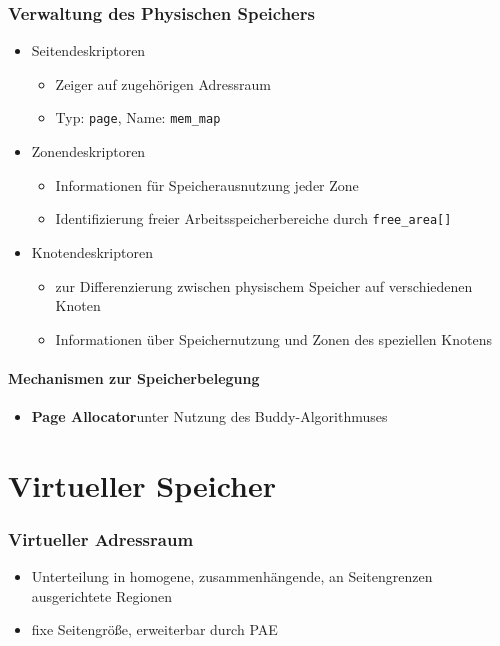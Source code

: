 \documentclass[ddcfooter,nosectionnum]{tudbeamer}
\begin{document}
\begin{frame}
	\frametitle{Verwaltung des Physischen Speichers}
    \begin{itemize}
    	\item Seitendeskriptoren
        \begin{itemize}
			\item Zeiger auf zugehörigen Adressraum
			\item Typ: \texttt{page}, Name: \texttt{mem\_map}
       	\end{itemize}
		\item Zonendeskriptoren
		\begin{itemize}
			\item Informationen für Speicherausnutzung jeder Zone
			\item Identifizierung freier Arbeitsspeicherbereiche durch
			\texttt{free\_area[]}
		\end{itemize}
		\item Knotendeskriptoren
		\begin {itemize}
			\item zur Differenzierung zwischen physischem Speicher auf verschiedenen Knoten	
			\item Informationen über Speichernutzung und Zonen des speziellen Knotens
		\end {itemize}			
   	\end{itemize} 

   
       
\end{frame}

\begin{frame}
	\framesubtitle{Mechanismen zur Speicherbelegung}
	\begin{itemize}
		\item\textbf{Page Allocator}unter Nutzung des Buddy-Algorithmuses
	
	\end{itemize}
	
	
\end{frame}	

\section{Virtueller Speicher}
\begin{frame}
    \frametitle{Virtueller Adressraum}
    \begin{itemize}
         \item   Unterteilung in homogene, zusammenhängende, an Seitengrenzen ausgerichtete 			Regionen
         \item fixe Seitengröße, erweiterbar durch PAE
        
     \end{itemize}
    
\end{frame}
\end{document}
